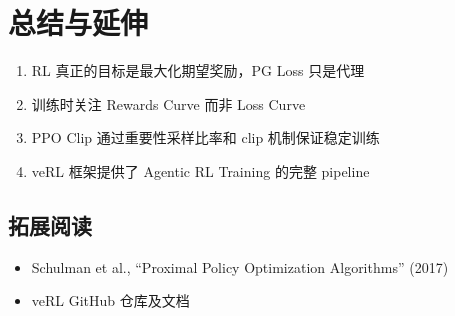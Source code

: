 \section{总结与延伸}
\begin{enumerate}
  \item RL 真正的目标是最大化期望奖励，PG Loss 只是代理
  \item 训练时关注 Rewards Curve 而非 Loss Curve
  \item PPO Clip 通过重要性采样比率和 clip 机制保证稳定训练
  \item veRL 框架提供了 Agentic RL Training 的完整 pipeline
\end{enumerate}

\subsection{拓展阅读}
\begin{itemize}
  \item Schulman et al., ``Proximal Policy Optimization Algorithms'' (2017)
  \item veRL GitHub 仓库及文档
\end{itemize}

